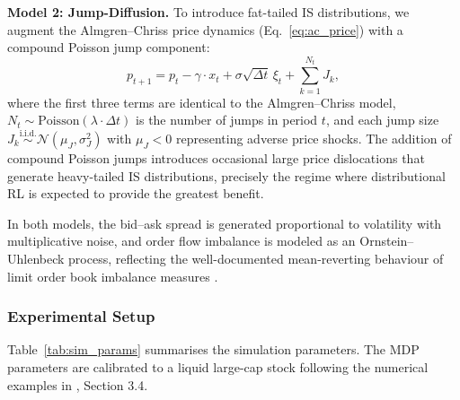 \documentclass[11pt]{article}
\begin{document}
\textbf{Model 2: Jump-Diffusion.} To introduce fat-tailed IS 
distributions, we augment the Almgren--Chriss price dynamics 
(Eq.~\ref{eq:ac_price}) with a compound Poisson jump component:
\begin{equation}\label{eq:jd_price}
    p_{t+1} = p_t - \gamma \cdot x_t + \sigma \sqrt{\Delta t}\, 
    \xi_t + \sum_{k=1}^{N_t} J_k,
\end{equation}
where the first three terms are identical to the Almgren--Chriss 
model, $N_t \sim \mathrm{Poisson}(\lambda \cdot \Delta t)$ is the 
number of jumps in period $t$, and each jump size 
$J_k \overset{\text{i.i.d.}}{\sim} \mathcal{N}(\mu_J, \sigma_J^2)$ 
with $\mu_J < 0$ representing adverse price shocks. The addition 
of compound Poisson jumps 
\citet{merton1976option} introduces occasional large price 
dislocations that generate heavy-tailed IS distributions, precisely 
the regime where distributional RL is expected to provide the 
greatest benefit.

In both models, the bid--ask spread is generated proportional to 
volatility with multiplicative noise, and order flow imbalance is modeled as an 
Ornstein--Uhlenbeck process, reflecting the well-documented 
mean-reverting behaviour of limit order book imbalance 
measures \citet{lehalle2019incorporating}.  
\subsubsection*{Experimental Setup}
Table~\ref{tab:sim_params} summarises the simulation parameters.  The MDP parameters are calibrated to a liquid large-cap 
stock following the numerical examples in 
\citet{almgren2001optimal}, Section 3.4.
\end{document}
